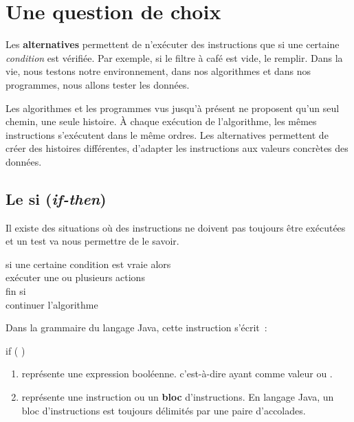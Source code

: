 \chapter{Une question de choix}

	Les \textbf{alternatives} permettent de n’exécuter des
	instructions que si une certaine \emph{condition} est vérifiée.  
	Par exemple, si le filtre à café est vide, le remplir. Dans la vie, nous 
	testons notre environnement, dans nos algorithmes
	et dans nos programmes, nous allons tester les données.
	
	Les algorithmes et les programmes vus jusqu’à présent ne proposent qu’un
	seul \og{}chemin\fg{}, une seule \og{}histoire\fg{}.  À chaque exécution de
	l’algorithme, les mêmes instructions s’exécutent dans le même ordres.  Les
	alternatives permettent de créer des histoires différentes, d’adapter les
	instructions aux valeurs concrètes des données.  

	\minitoc 

\section{Le si (\textit{if-then})}
		
	Il existe des situations où des instructions ne doivent pas toujours être
	exécutées et un test va nous permettre de le savoir.
	
	\begin{langagenaturel}
		si une certaine condition est vraie alors\\
		\tab exécuter une ou plusieurs actions\\
		fin si\\
		continuer l'algorithme
	\end{langagenaturel}

	Dans la grammaire du langage Java, cette instruction s'écrit~:
	
	\begin{grammaire}
		    if (  )
	\end{grammaire}

	\begin{enumerate}
		\item {} représente une expression booléenne. 
			c'est-à-dire ayant comme valeur  ou .
		\item {} représente une instruction ou un 
			\textbf{bloc} d'instructions. En langage Java, un bloc 
			 d'instructions est toujours délimités par une paire 
			d'accolades. 
	\end{enumerate}

